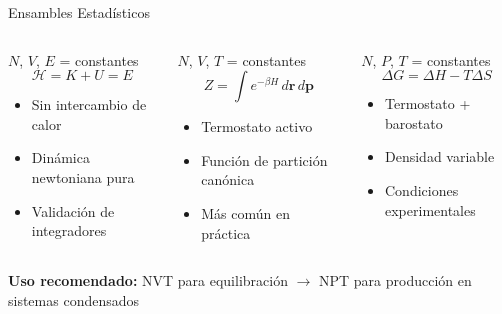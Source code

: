 \documentclass[aspectratio=169, 10pt]{beamer}
\begin{document}
\begin{frame}{Ensambles Estadísticos}

\begin{columns}[T]
\begin{tcolorbox}[formulabox, title={NVE (Microcanónico)}, equal height group=ehg-ens]
\small
\centering
$N$, $V$, $E$ = constantes \\[4pt]
\[
\mathcal{H} = K + U = E
\]
\vspace{2pt}
\begin{itemize}\small
  \item Sin intercambio de calor
  \item Dinámica newtoniana pura
  \item Validación de integradores
\end{itemize}
\end{tcolorbox}

\begin{tcolorbox}[definitionbox, title={NVT (Canónico)}, equal height group=ehg-ens]
\small
\centering
$N$, $V$, $T$ = constantes \\[4pt]
\[
Z = \int e^{-\beta H}\,d\mathbf{r}\,d\mathbf{p}
\]
\vspace{2pt}
\begin{itemize}\small
  \item Termostato activo
  \item Función de partición canónica
  \item Más común en práctica
\end{itemize}
\end{tcolorbox}

\begin{tcolorbox}[warningbox, title={NPT (Isotérmico-isob.)}, equal height group=ehg-ens]
\small
\centering
$N$, $P$, $T$ = constantes \\[4pt]
\[
\Delta G = \Delta H - T\Delta S
\]
\vspace{2pt}
\begin{itemize}\small
  \item Termostato + barostato
  \item Densidad variable
  \item Condiciones experimentales
\end{itemize}
\end{tcolorbox}
\end{columns}

\vspace{0.5em}
\begin{tcolorbox}[comparisonbox]
\centering\small
\textbf{Uso recomendado:} NVT para equilibración $\rightarrow$ NPT para producción en sistemas condensados
\end{tcolorbox}
\end{frame}
\end{document}
